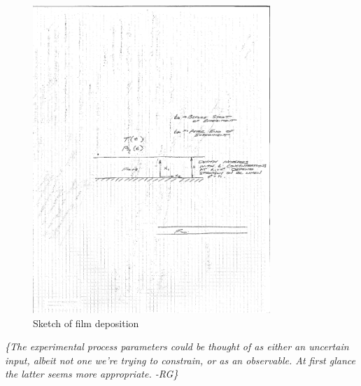 \documentclass[11pt]{article}
\newcommand{\remrg}[1]{ {\it \color{drkgrn} \{#1 -RG\}}}
\begin{document}
\begin{figure}[h]
  \centering
  \includegraphics[width=0.8\textwidth]{pd_sketch.pdf}
  \caption{Sketch of film deposition}
  \label{fig:film}
\end{figure}


\remrg{The experimental process parameters could be
  thought of as either an uncertain input, albeit not one we're
  trying to constrain, or as an observable. At first glance the latter
  seems more appropriate.}
\end{document}
